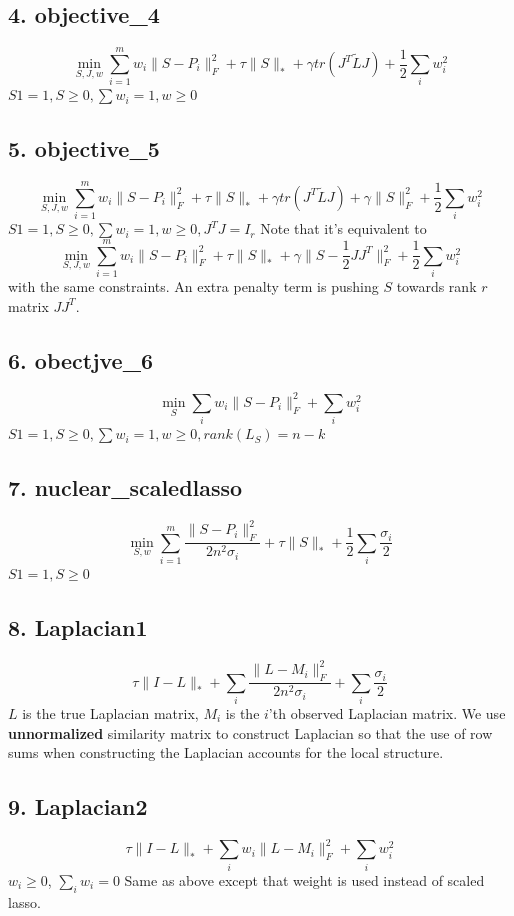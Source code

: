 \documentclass[11pt]{article}
\begin{document}
\subsection*{4. objective\_4}
$$\min_{S,J,w} \sum_{i=1}^{m} w_i \|S-P_i\|_F^2 + \tau \|S\|_* + \gamma tr(J^T \tilde{L} J)+ \frac{1}{2} \sum_i w_i^2$$
$S1 = 1, S\geq 0, \sum w_i = 1, w \geq 0$
\subsection*{5. objective\_5}
$$\min_{S,J,w} \sum_{i=1}^{m} w_i \|S-P_i\|_F^2 + \tau \|S\|_* + \gamma tr(J^T \tilde{L} J)+\gamma \|S\|_F^2 + \frac{1}{2} \sum_i w_i^2$$
$S1 = 1, S\geq 0, \sum w_i = 1, w \geq 0, J^TJ = I_r$
\noindent Note that it's equivalent to
$$\min_{S,J,w} \sum_{i=1}^{m} w_i \|S-P_i\|_F^2 + \tau \|S\|_* + \gamma \|S - \frac{1}{2} JJ^T \|_F^2 + \frac{1}{2} \sum_i w_i^2$$
with the same constraints. An extra penalty term is pushing $S$ towards rank $r$ matrix $JJ^T$. 
\subsection*{6. obectjve\_6}
$$\min_{S} \sum_i w_i \|S-P_i\|_F^2 + \sum_i w_i^2$$
$S1 = 1, S\geq 0, \sum w_i = 1, w \geq 0, rank(L_S) = n-k$
\subsection*{7. nuclear\_scaledlasso}
$$\min_{S,w} \sum_{i=1}^{m} \frac{\|S-P_i\|_F^2}{2n^2 \sigma_i} + \tau \|S\|_* + \frac{1}{2} \sum_i \frac{\sigma_i}{2}$$
$S1 = 1, S\geq 0$
\subsection*{8. Laplacian1}
$$\tau \|I - L\|_* + \sum_i \frac{\|L-M_i\|_F^2}{2n^2 \sigma_i} + \sum_i \frac{\sigma_i}{2}$$
$L$ is the true Laplacian matrix, $M_i$ is the $i$'th observed Laplacian matrix. We use \textbf{unnormalized} similarity matrix to construct Laplacian so that the use of row sums when constructing the Laplacian accounts for the local structure. 
\subsection*{9. Laplacian2}
$$\tau \|I - L\|_* + \sum_i w_i \|L-M_i\|_F^2 + \sum_i w_i^2$$
$w_i \geq 0$, $\sum_i w_i = 0$
Same as above except that weight is used instead of scaled lasso.


\pagebreak
\end{document}
